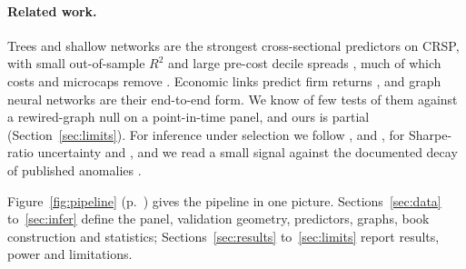\paragraph{Related work.}
Trees and shallow networks are the strongest cross-sectional predictors on CRSP, with small out-of-sample $R^2$ and large pre-cost decile spreads \citep{gkx2020}, much of which costs and microcaps remove \citep{avramov2023}. Economic links predict firm returns \citep{cohenfrazzini2008,menzlyozbas2010}, and graph neural networks \citep{kipfwelling2017,hamilton2017,velickovic2018,schlichtkrull2018} are their end-to-end form. We know of few tests of them against a rewired-graph null on a point-in-time panel, and ours is partial (Section~\ref{sec:limits}). For inference under selection we follow \citet{harveyliuzhu2016}, \citet{baileylopez2014} and \citet{hansen2005}, for Sharpe-ratio uncertainty \citet{lo2002} and \citet{ledoitwolf2008}, and we read a small signal against the documented decay of published anomalies \citep{mcleanpontiff2016,houxuezhang2020}.

Figure~\ref{fig:pipeline} (p.~\pageref{fig:pipeline}) gives the pipeline in one picture. Sections~\ref{sec:data} to~\ref{sec:infer} define the panel, validation geometry, predictors, graphs, book construction and statistics; Sections~\ref{sec:results} to~\ref{sec:limits} report results, power and limitations.
